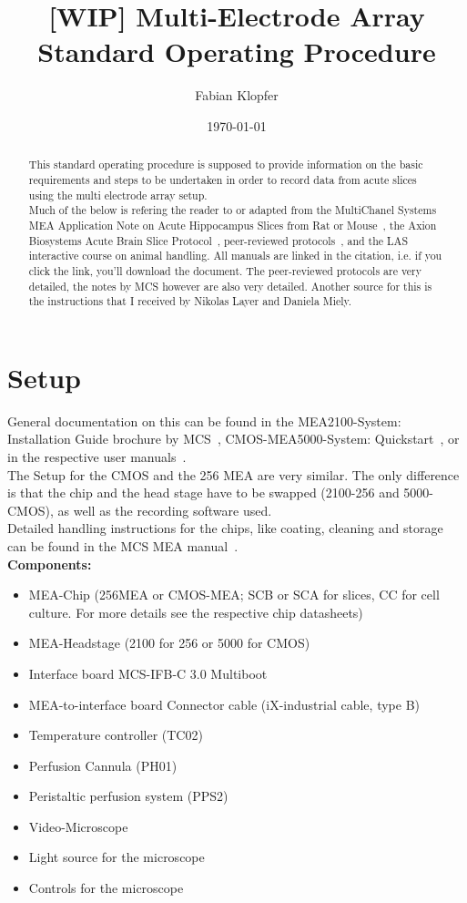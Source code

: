 \documentclass[11pt]{article}
\date{\today}
\author{Fabian Klopfer}
\title{[WIP] Multi-Electrode Array \\ Standard Operating Procedure}
\begin{document}
\thesistitlepage[language=english]


\begin{abstract}
 This standard operating procedure is supposed to provide information on the basic requirements and steps to be undertaken in order to record data from acute slices using the multi electrode array setup. \\

Much of the below is refering the reader to or adapted from the MultiChanel Systems MEA Application Note on
Acute Hippocampus Slices from Rat or Mouse~\cite{mcs}, the Axion Biosystems Acute Brain Slice Protocol~\cite{axion}, peer-reviewed protocols~\cite{star},\cite[chapter~6]{dallas2021patch} and the LAS interactive course on animal handling\cite{las}.
All manuals are linked in the citation, i.e. if you click the link, you'll download the document.
The peer-reviewed protocols are very detailed, the notes by MCS however are also very detailed.
Another source for this is the instructions that I received by Nikolas Layer and Daniela Miely.
\end{abstract}


\tableofcontents
\newpage

\section{Setup}
    General documentation on this can be found in the MEA2100-System: Installation Guide brochure by MCS~\cite{2100-install}, CMOS-MEA5000-System: Quickstart~\cite{5000-quick}, or in the respective user manuals~\cite{2100-man, 5000-man}. \\

    The Setup for the CMOS and the 256 MEA are very similar. The only difference is that the chip and the head stage have to be swapped (2100-256 and 5000-CMOS), as well as the recording software used. \\

    Detailed handling instructions for the chips, like coating, cleaning and storage can be found in the MCS MEA manual~\cite{mea-man}. \\

    \textbf{Components:}
    \begin{itemize}
     \item MEA-Chip (256MEA or CMOS-MEA; SCB or SCA for slices, CC for cell culture. For more details see the respective chip datasheets)
     \item MEA-Headstage (2100 for 256 or 5000 for CMOS)
     \item Interface board MCS-IFB-C 3.0 Multiboot
     \item MEA-to-interface board Connector cable (iX-industrial cable, type B)
     \item Temperature controller (TC02)
     \item Perfusion Cannula (PH01)
     \item Peristaltic perfusion system (PPS2)
     \item Video-Microscope
     \item Light source for the microscope
     \item Controls for the microscope
    \end{itemize}
\end{document}
